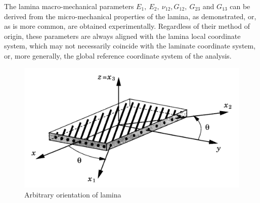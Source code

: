 The lamina macro-mechanical parameters $E_1,\ E_2,\ \nu_{12}, G_{12},\ G_{23}$ and $G_{13}$ can be derived from the micro-mechanical properties of the lamina, as demonstrated, or, as is more common, are obtained experimentally. Regardless of their method of origin, these parameters are always aligned with the lamina local coordinate system, which may not necessarily coincide with the laminate coordinate system, or, more generally, the global reference coordinate system of the analysis.

\begin{figure}[h!]
	\centering
	\includegraphics[width=12cm]{images/composite_lamina_orientation}
	\caption{Arbitrary orientation of lamina \cite{reddy2004mechanics}}
	\label{fig:compositelaminaorientation}
\end{figure}


